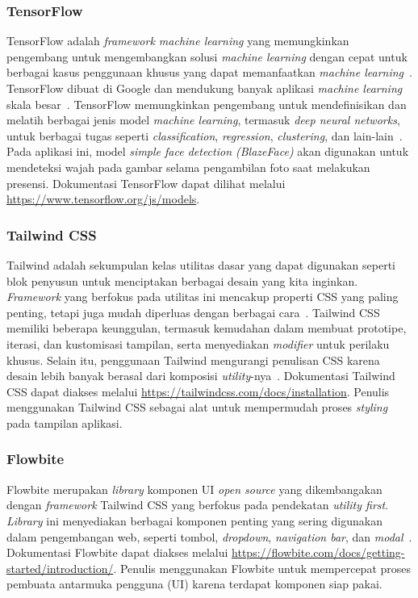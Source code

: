 \subsubsection{TensorFlow}
TensorFlow adalah \textit{framework machine learning} yang memungkinkan pengembang untuk mengembangkan solusi \textit{machine learning} dengan cepat untuk berbagai kasus penggunaan khusus yang dapat memanfaatkan  \textit{machine learning}~\cite{thushan2022tensorflow}. TensorFlow dibuat di Google dan mendukung banyak aplikasi  \textit{machine learning} skala besar~\cite{hands2022aurelien}. TensorFlow memungkinkan pengembang untuk mendefinisikan dan melatih berbagai jenis model \textit{machine learning}, termasuk \textit{deep neural networks}, untuk berbagai tugas seperti \textit{classification}, \textit{regression}, \textit{clustering}, dan lain-lain~\cite{mastering2024hasan}. Pada aplikasi ini, model \textit{simple face detection (BlazeFace)} akan digunakan untuk mendeteksi wajah pada gambar selama pengambilan foto saat melakukan presensi. Dokumentasi TensorFlow dapat dilihat melalui \url{https://www.tensorflow.org/js/models}.

\subsubsection{Tailwind CSS}
Tailwind adalah sekumpulan kelas utilitas dasar yang dapat digunakan seperti blok penyusun untuk menciptakan berbagai desain yang kita inginkan. \textit{Framework} yang berfokus pada utilitas ini mencakup properti CSS yang paling penting, tetapi juga mudah diperluas dengan berbagai cara~\cite{tailwind2022ivaylo}. Tailwind CSS memiliki beberapa keunggulan, termasuk kemudahan dalam membuat prototipe, iterasi, dan kustomisasi tampilan, serta menyediakan \textit{modifier} untuk perilaku khusus. Selain itu, penggunaan Tailwind mengurangi penulisan CSS karena desain lebih banyak berasal dari komposisi \textit{utility}-nya~\cite{modern2022noel}. Dokumentasi Tailwind CSS dapat diakses melalui \url{https://tailwindcss.com/docs/installation}. Penulis menggunakan Tailwind CSS sebagai alat untuk mempermudah proses \textit{styling} pada tampilan aplikasi.


\subsubsection{Flowbite}
Flowbite merupakan \textit{library} komponen UI \textit{open source} yang dikembangakan dengan \textit{framework} Tailwind CSS yang berfokus pada pendekatan \textit{utility first}. \textit{Library} ini menyediakan berbagai komponen penting yang sering digunakan dalam pengembangan web, seperti tombol, \textit{dropdown}, \textit{navigation bar}, dan \textit{modal}~\cite{introduction2024flowbite}. Dokumentasi Flowbite dapat diakses melalui \url{https://flowbite.com/docs/getting-started/introduction/}. Penulis menggunakan Flowbite untuk mempercepat proses pembuata antarmuka pengguna (UI) karena terdapat komponen siap pakai.


